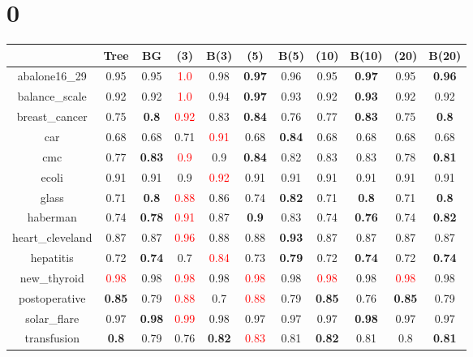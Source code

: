 \documentclass{article}%
\begin{document}
%
\normalsize%
\section*{0}%
\begin{tabular}{c|cccccccccc}%
\hline%
&Tree&BG&(3)&B(3)&(5)&B(5)&(10)&B(10)&(20)&B(20)\\%
\hline%
abalone16\_29&0.95&0.95&\textcolor{red}{ 
1.0
}&0.98&\textbf{0.97}&0.96&0.95&\textbf{0.97}&0.95&\textbf{0.96}\\%
\hline%
balance\_scale&0.92&0.92&\textcolor{red}{ 
1.0
}&0.94&\textbf{0.97}&0.93&0.92&\textbf{0.93}&0.92&0.92\\%
\hline%
breast\_cancer&0.75&\textbf{0.8}&\textcolor{red}{ 
0.92
}&0.83&\textbf{0.84}&0.76&0.77&\textbf{0.83}&0.75&\textbf{0.8}\\%
\hline%
car&0.68&0.68&0.71&\textcolor{red}{ 
0.91
}&0.68&\textbf{0.84}&0.68&0.68&0.68&0.68\\%
\hline%
cmc&0.77&\textbf{0.83}&\textcolor{red}{ 
0.9
}&0.9&\textbf{0.84}&0.82&0.83&0.83&0.78&\textbf{0.81}\\%
\hline%
ecoli&0.91&0.91&0.9&\textcolor{red}{ 
0.92
}&0.91&0.91&0.91&0.91&0.91&0.91\\%
\hline%
glass&0.71&\textbf{0.8}&\textcolor{red}{ 
0.88
}&0.86&0.74&\textbf{0.82}&0.71&\textbf{0.8}&0.71&\textbf{0.8}\\%
\hline%
haberman&0.74&\textbf{0.78}&\textcolor{red}{ 
0.91
}&0.87&\textbf{0.9}&0.83&0.74&\textbf{0.76}&0.74&\textbf{0.82}\\%
\hline%
heart\_cleveland&0.87&0.87&\textcolor{red}{ 
0.96
}&0.88&0.88&\textbf{0.93}&0.87&0.87&0.87&0.87\\%
\hline%
hepatitis&0.72&\textbf{0.74}&0.7&\textcolor{red}{ 
0.84
}&0.73&\textbf{0.79}&0.72&\textbf{0.74}&0.72&\textbf{0.74}\\%
\hline%
new\_thyroid&\textcolor{red}{ 
0.98
}&0.98&\textcolor{red}{ 
0.98
}&0.98&\textcolor{red}{ 
0.98
}&0.98&\textcolor{red}{ 
0.98
}&0.98&\textcolor{red}{ 
0.98
}&0.98\\%
\hline%
postoperative&\textbf{0.85}&0.79&\textcolor{red}{ 
0.88
}&0.7&\textcolor{red}{ 
0.88
}&0.79&\textbf{0.85}&0.76&\textbf{0.85}&0.79\\%
\hline%
solar\_flare&0.97&\textbf{0.98}&\textcolor{red}{ 
0.99
}&0.98&0.97&0.97&0.97&\textbf{0.98}&0.97&0.97\\%
\hline%
transfusion&\textbf{0.8}&0.79&0.76&\textbf{0.82}&\textcolor{red}{ 
0.83
}&0.81&\textbf{0.82}&0.81&0.8&\textbf{0.81}\\%

\end{tabular}
\end{document}
